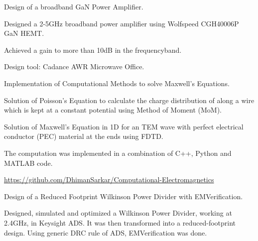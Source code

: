 

\begin{cventries}
  \cventry
    {Design of a broadband GaN Power Amplifier.} %
    {} %
    {} %
    {} %
    {
      \begin{cvitems} %
        \item {Designed a 2-5GHz broadband power amplifier using Wolfspeed CGH40006P GaN HEMT.}
        \item {Achieved a gain to more than 10dB in the frequencyband.}
        \item {Design tool: Cadance AWR Microwave Office.}
      \end{cvitems}
    }


  \cventry
    {Implementation of Computational Methods to solve Maxwell's Equations.} %
    {} %
    {} %
    {} %
    {
      \begin{cvitems} %
        \item {Solution of Poisson's Equation to calculate the charge distribution of along a wire which is kept at a constant potential using Method of Moment (MoM).}
        \item {Solution of Maxwell's Equation in 1D for an TEM wave with perfect electrical conductor (PEC) material at the ends using FDTD.}
        \item {The computation was implemented in a combination of C++, Python and MATLAB code.}
        \item {\href{https://github.com/DhimanSarkar/Computational-Electromagnetics}{https://github.com/DhimanSarkar/Computational-Electromagnetics}}
      \end{cvitems}
    }


  \cventry
    {Design of a Reduced Footprint Wilkinson Power Divider with EMVerification.} %
    {} %
    {} %
    {} %
    {
      \begin{cvitems} %
        \item {Designed, simulated and optimized a Wilkinson Power Divider, working at 2.4GHz, in Keysight ADS. It was then transformed into a reduced-footprint design. Using generic DRC rule of ADS, EMVerification was done.}
      \end{cvitems}
    }


\end{cventries}

